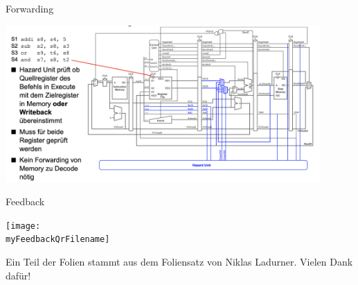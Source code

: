 \documentclass[
  german,            %
  aspectratio=169,    %
]{tumbeamer}
\begin{document}
\begin{frame}[c, fragile]{Forwarding}{}
	\begin{center}
		\includegraphics[width=0.9\textwidth]{w11_forwarding.png}		
	\end{center}
\end{frame}

\begin{frame}[c]{Feedback}{} 
  \begin{center}
    \texttt{[image: \\myFeedbackQrFilename]}
  \end{center}
  \begin{center}
    \LARGE \href{\myFeedbackLink}{\myFeedbackLink}
  \end{center}
  \vspace{0.5cm}
  \begin{center}
    \small Ein Teil der Folien stammt aus dem Foliensatz von Niklas Ladurner. Vielen Dank dafür!
  \end{center}
\end{frame}
\end{document}
